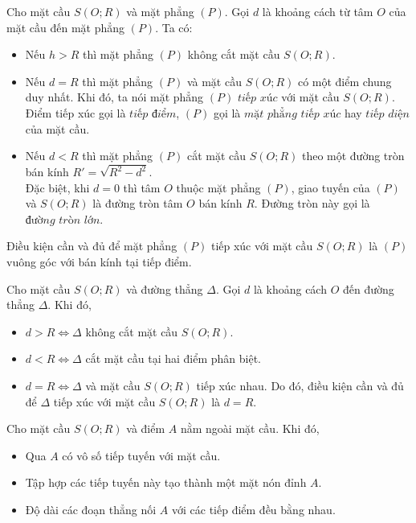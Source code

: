 \begin{tc}
	Cho mặt cầu $S(O;R)$ và mặt phẳng $(P)$. Gọi $d$ là khoảng cách từ tâm $O$ của mặt cầu đến mặt phẳng $(P)$. Ta có:
	\begin{itemize}
		\item Nếu $h>R$ thì mặt phẳng $(P)$ không cắt mặt cầu $S(O;R)$.
		\item Nếu $d=R$ thì mặt phẳng $(P)$ và mặt cầu $S(O;R)$ có một điểm chung duy nhất. Khi đó, ta nói mặt phẳng $(P)$ $\textit{tiếp xúc}$ với mặt cầu $S(O;R)$.\\
		Điểm tiếp xúc gọi là $\textit{tiếp điểm}$, $(P)$ gọi là $\textit{mặt phẳng tiếp xúc}$ hay $\textit{tiếp diện}$ của mặt cầu.
		\item Nếu $d<R$ thì mặt phẳng $(P)$ cắt mặt cầu $S(O;R)$ theo một đường tròn bán kính $R'=\sqrt{R^2-d^2}$.\\
		Đặc biệt, khi $d=0$ thì tâm $O$ thuộc mặt phẳng $(P)$, giao tuyến của $(P)$ và $S(O;R)$ là đường tròn tâm $O$ bán kính $R$. Đường tròn này gọi là $\textit{đường tròn lớn}$.	
	\end{itemize}
\end{tc}

\begin{note}
	Điều kiện cần và đủ để mặt phẳng $(P)$ tiếp xúc với mặt cầu $S(O;R)$ là $(P)$ vuông góc với bán kính tại tiếp điểm.
\end{note}

\begin{tc}
	Cho mặt cầu $S(O;R)$ và đường thẳng $\Delta$. Gọi $d$ là khoảng cách $O$ đến đường thẳng $\Delta$. Khi đó,
	\begin{itemize}
		\item $d>R\Leftrightarrow \Delta$ không cắt mặt cầu $S(O;R)$.
		\item $d<R\Leftrightarrow \Delta$ cắt mặt cầu tại hai điểm phân biệt.
		\item $d=R\Leftrightarrow\Delta$ và mặt cầu $S(O;R)$ tiếp xúc nhau. Do đó, điều kiện cần và đủ để $\Delta$ tiếp xúc với mặt cầu $S(O;R)$ là $d=R$. 
	\end{itemize}
\end{tc}

\begin{dl}
	Cho mặt cầu $S(O;R)$ và điểm $A$ nằm ngoài mặt cầu. Khi đó,
	\begin{itemize}
		\item Qua $A$ có vô số tiếp tuyến với mặt cầu. 
		\item Tập hợp các tiếp tuyến này tạo thành một mặt nón đỉnh $A$. 
		\item Độ dài các đoạn thẳng nối $A$ với các tiếp điểm đều bằng nhau.
	\end{itemize}
\end{dl}

